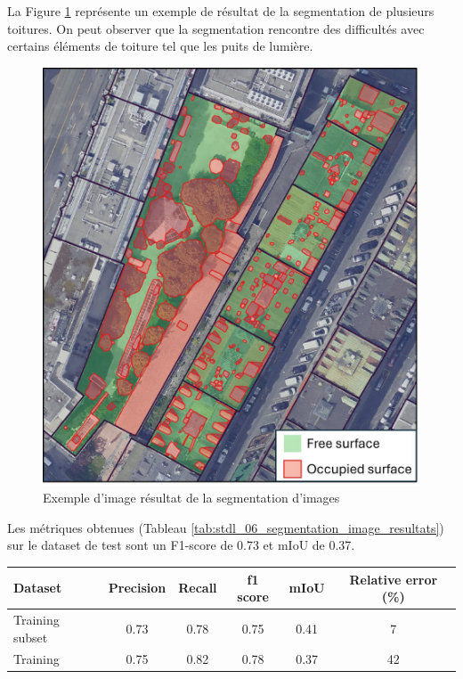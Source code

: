 {{{{\par{La Figure \ref{fig:stdl_09_segmentation_image_resultats} représente un exemple de résultat de la segmentation de plusieurs toitures. On peut observer que la segmentation rencontre des difficultés avec certains éléments de toiture tel que les puits de lumière.}
\begin{figure}[H]
    \centering
    \includegraphics[width=1\linewidth]{02-main//figures/stdl_09_segmentation_image_resultats.png}
    \caption{Exemple d’image résultat de la segmentation d’images \cite{herny_detection_2024}}
    \label{fig:stdl_09_segmentation_image_resultats}
\end{figure}
\newpage
\par{Les métriques obtenues (Tableau \ref{tab:stdl_06_segmentation_image_resultats}) sur le dataset de test sont un F1-score de 0.73 et mIoU de 0.37.}
\begin{table}[H]
    \centering
    \begin{tabular}{|l|c|c|c|c|c|}
    \hline
    Dataset & Precision & Recall & f1 score & mIoU & Relative error (\%) \\
    \hline
    Training subset & 0.73 & 0.78 & 0.75 & 0.41 & 7 \\
    Training & 0.75 & 0.82 & 0.78 & 0.37 & 42 \\

\end{tabular}
\end{table}}}}}
